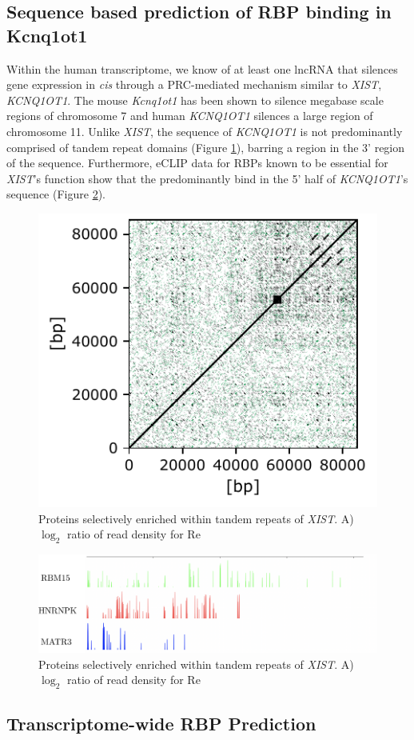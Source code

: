 \subsection{Sequence based prediction of RBP binding in Kcnq1ot1}
Within the human transcriptome, we know of at least one lncRNA that silences gene expression in \emph{cis} through a PRC-mediated mechanism similar to \emph{XIST}, \emph{KCNQ1OT1}. The mouse \emph{Kcnq1ot1} has been shown to silence megabase scale regions of chromosome 7 and human \emph{KCNQ1OT1} silences a large region of chromosome 11. Unlike \emph{XIST}, the sequence of \emph{KCNQ1OT1} is not predominantly comprised of tandem repeat domains (Figure \ref{fig:kcndot}), barring a region in the 3' region of the sequence. Furthermore, eCLIP data for RBPs known to be essential for \emph{XIST}'s function show that the predominantly bind in the 5' half of \emph{KCNQ1OT1}'s sequence (Figure \ref{fig:kcnproteins}). 

\begin{figure}[h!]
\centering
\includegraphics[width=.4\textwidth]{images/kcnd.pdf}
\caption{Proteins selectively enriched within tandem repeats of \emph{XIST}. A) $\log_2$ ratio of read density for Re}
\label{fig:kcndot}
\end{figure}

\begin{figure}[h!]
\centering
\includegraphics[width=\textwidth]{images/kcnproteins.pdf}
\caption{Proteins selectively enriched within tandem repeats of \emph{XIST}. A) $\log_2$ ratio of read density for Re}
\label{fig:kcnproteins}
\end{figure}
\subsection{Transcriptome-wide RBP Prediction}
\lipsum[1-2]

